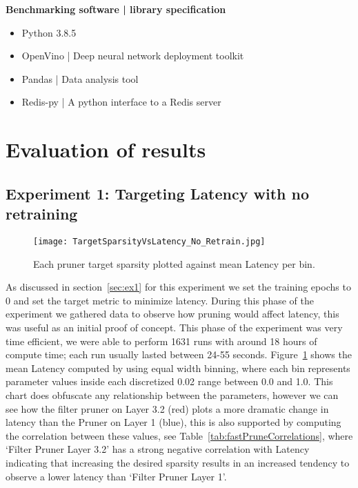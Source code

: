 \documentclass[../Dissertation.tex]{subfiles}
\begin{document}
\noindent\textbf{Benchmarking software | library specification}
\begin{itemize}
    \item Python 3.8.5
    \item OpenVino | Deep neural network deployment toolkit
    \item Pandas | Data analysis tool
    \item Redis-py | A python interface to a Redis server
\end{itemize}



\section{Evaluation of results}

\subsection{Experiment 1: Targeting Latency with no retraining}\label{sec:FastPruningPhase}

\begin{figure}[H]
    \texttt{[image: TargetSparsityVsLatency\_No\_Retrain.jpg]}
    \caption{Each pruner target sparsity plotted against mean Latency per bin.}
    \label{fig:fastPruneParamVSLatency}
\end{figure}

As discussed in section~\ref{sec:ex1} for this experiment we set the training epochs to 0 and set the target metric to minimize latency. 
During this phase of the experiment we gathered data to observe how pruning would affect latency, this was useful as an initial proof of concept.
This phase of the experiment was very time efficient, we were able to perform 1631 runs with around 18 hours of compute time; each run usually lasted between 24-55 seconds. 
Figure~\ref{fig:fastPruneParamVSLatency} shows the mean Latency computed by using equal width binning, where each bin represents parameter values inside each discretized 0.02 range between 0.0 and 1.0.
This chart does obfuscate any relationship between the parameters, however we can see how the filter pruner on Layer 3.2 (red) plots a more dramatic change in latency than the Pruner on Layer 1 (blue), this is also supported by computing the correlation between these values, see Table~\ref{tab:fastPruneCorrelations}, where `Filter Pruner Layer 3.2' has a strong negative correlation with Latency indicating that increasing the desired sparsity results in an increased tendency to observe a lower latency than `Filter Pruner Layer 1'.
\end{document}
